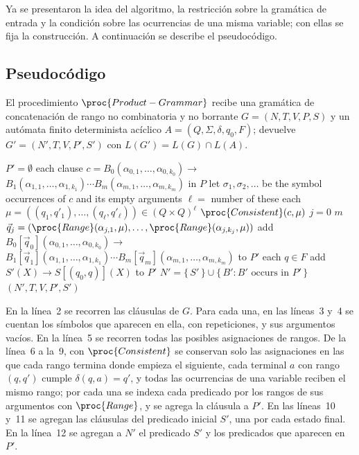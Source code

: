 \documentclass{report}
\theoremstyle{definition}
\theoremstyle{plain}
\begin{document}
Ya se presentaron la idea del algoritmo, la restricción sobre la
gramática de entrada y la condición sobre las ocurrencias de una misma
variable; con ellas se fija la construcción. A continuación se describe
el pseudocódigo.

\subsection{Pseudocódigo}

El procedimiento $\proc{Product-Grammar}$ recibe una gramática de
concatenación de rango no combinatoria y
no borrante $G = (N, T, V, P, S)$ y un autómata finito
determinista acíclico $A = (Q, \Sigma, \delta, q_0, F)$; devuelve
$G' = (N', T, V, P', S')$ con $L(G') = L(G) \cap L(A)$.

\begin{codebox}
\li $P' = \emptyset$
\li \For each clause $c = B_0(\alpha_{0,1}, \ldots, \alpha_{0,k_0}) \to {}$
\zi \qquad $B_1(\alpha_{1,1}, \ldots, \alpha_{1,k_1}) \cdots B_m(\alpha_{m,1}, \ldots, \alpha_{m,k_m})$ in $P$
\li \Do
        let $\sigma_1, \sigma_2, \ldots$ be the symbol occurrences of $c$ and its empty arguments
\li     $\ell = $ number of these
\li     \For each $\mu = ((q_1, q'_1), \ldots, (q_\ell, q'_\ell)) \in (Q \times Q)^\ell$
\li     \Do
            \If $\proc{Consistent}(c, \mu)$
\li         \Then
                \For $j = 0$ \To $m$
\li             \Do
                    $\vec{q}_j = (\proc{Range}(\alpha_{j,1}, \mu), \ldots, \proc{Range}(\alpha_{j,k_j}, \mu))$
                \End
\li             add $B_0[\vec{q}_0](\alpha_{0,1}, \ldots, \alpha_{0,k_0}) \to {}$
\zi \qquad\qquad $B_1[\vec{q}_1](\alpha_{1,1}, \ldots, \alpha_{1,k_1}) \cdots B_m[\vec{q}_m](\alpha_{m,1}, \ldots, \alpha_{m,k_m})$ to $P'$
            \End
        \End
    \End
\li \For each $q \in F$
\li \Do
        add $S'(X) \to S[(q_0, q)](X)$ to $P'$
    \End
\li $N' = \{\, S' \,\} \cup \{\, B' : B' \text{ occurs in } P' \,\}$
\li \Return $(N', T, V, P', S')$
\end{codebox}

En la línea~2 se recorren las cláusulas de $G$. Para cada una, en las
líneas~3 y~4 se cuentan los símbolos que aparecen en ella, con
repeticiones, y sus argumentos vacíos. En la línea~5 se recorren todas
las posibles asignaciones de rangos. De la línea~6 a la~9, con $\proc{Consistent}$ se conservan
solo las asignaciones en las que cada rango termina donde empieza el
siguiente, cada terminal $a$ con rango $(q, q')$ cumple
$\delta(q, a) = q'$, y todas las ocurrencias de una variable reciben el
mismo rango; por cada una se indexa cada predicado por los rangos de sus
argumentos con $\proc{Range}$, y se agrega la cláusula a $P'$. En las líneas~10 y~11 se
agregan las cláusulas del predicado inicial $S'$, una por cada estado
final. En la línea~12 se agregan a $N'$ el
predicado $S'$ y los predicados que aparecen en $P'$.
\end{document}

